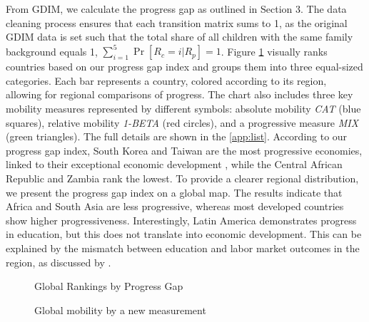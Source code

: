 From GDIM, we calculate the progress gap as outlined in Section 3. The data cleaning process ensures that each transition matrix sums to 1, as the original GDIM data is set such that the total share of all children with the same family background equals 1, \(\sum_{i=1}^{5} \operatorname{Pr}[R_c = i| R_p] = 1\). Figure \ref{fig:rank} visually ranks countries based on our progress gap index and groups them into three equal-sized categories. Each bar represents a country, colored according to its region, allowing for regional comparisons of progress. The chart also includes three key mobility measures represented by different symbols: absolute mobility \textit{CAT} (blue squares), relative mobility \textit{1-BETA} (red circles), and a progressive measure \textit{MIX} (green triangles). The full details are shown in the  \ref{app:list}. According to our progress gap index, South Korea and Taiwan are the most progressive economies, linked to their exceptional economic development \citep{morris1996asia}, while the Central African Republic and Zambia rank the lowest. To provide a clearer regional distribution, we present the progress gap index on a global map. The results indicate that Africa and South Asia are less progressive, whereas most developed countries show higher progressiveness. Interestingly, Latin America demonstrates progress in education, but this does not translate into economic development. This can be explained by the mismatch between education and labor market outcomes in the region, as discussed by \citet{bassi2012disconnected}.

\begin{landscape}
\begin{figure}[H]
    \centering
    \scalebox{0.49}{}
    \caption{Global Rankings by Progress Gap}
    \label{fig:rank}
\end{figure}
\end{landscape} 

\begin{figure}[H]
    \centering
    \scalebox{0.55}{}
    \caption{Global mobility by a new measurement}
    \label{fig:map}
\end{figure}

